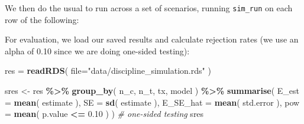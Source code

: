 \documentclass[
]{book}
\newenvironment{Shaded}{\begin{snugshade}}{\end{snugshade}}
\newcommand{\AttributeTok}[1]{\textcolor[rgb]{0.13,0.29,0.53}{#1}}
\newcommand{\CommentTok}[1]{\textcolor[rgb]{0.56,0.35,0.01}{\textit{#1}}}
\newcommand{\DecValTok}[1]{\textcolor[rgb]{0.00,0.00,0.81}{#1}}
\newcommand{\FloatTok}[1]{\textcolor[rgb]{0.00,0.00,0.81}{#1}}
\newcommand{\FunctionTok}[1]{\textcolor[rgb]{0.13,0.29,0.53}{\textbf{#1}}}
\newcommand{\NormalTok}[1]{#1}
\newcommand{\OtherTok}[1]{\textcolor[rgb]{0.56,0.35,0.01}{#1}}
\newcommand{\SpecialCharTok}[1]{\textcolor[rgb]{0.81,0.36,0.00}{\textbf{#1}}}
\newcommand{\StringTok}[1]{\textcolor[rgb]{0.31,0.60,0.02}{#1}}
\begin{document}
We then do the usual to run across a set of scenarios, running \texttt{sim\_run} on each row of the following:

\begin{Shaded}
\end{Shaded}

For evaluation, we load our saved results and calculate rejection rates (we use an alpha of 0.10 since we are doing one-sided testing):

\begin{Shaded}
\begin{Highlighting}[]
\NormalTok{res }\OtherTok{=} \FunctionTok{readRDS}\NormalTok{( }\AttributeTok{file=}\StringTok{"data/discipline\_simulation.rds"}\NormalTok{ )}

\NormalTok{sres }\OtherTok{\textless{}{-}}\NormalTok{ res }\SpecialCharTok{\%\textgreater{}\%} \FunctionTok{group\_by}\NormalTok{( n\_c, n\_t, tx, model ) }\SpecialCharTok{\%\textgreater{}\%}
    \FunctionTok{summarise}\NormalTok{( }\AttributeTok{E\_est =} \FunctionTok{mean}\NormalTok{( estimate ),}
               \AttributeTok{SE =} \FunctionTok{sd}\NormalTok{( estimate ),}
               \AttributeTok{E\_SE\_hat =} \FunctionTok{mean}\NormalTok{( std.error ),}
               \AttributeTok{pow =} \FunctionTok{mean}\NormalTok{( p.value }\SpecialCharTok{\textless{}=} \FloatTok{0.10}\NormalTok{ ) ) }\CommentTok{\# one{-}sided testing}
\NormalTok{sres}
\end{Highlighting}
\end{Shaded}
\end{document}
